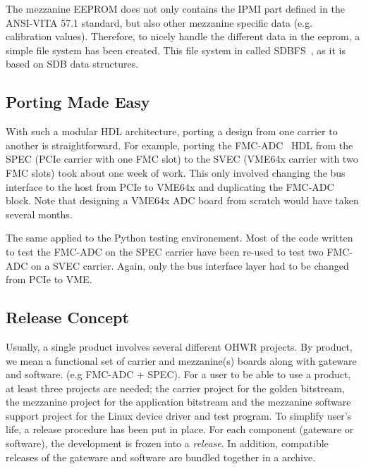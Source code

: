 \documentclass{JAC2003}
\begin{document}
The mezzanine EEPROM does not only contains the IPMI part defined in the ANSI-VITA 57.1 standard, but also other mezzanine specific data (e.g. calibration values).
Therefore, to nicely handle the different data in the eeprom, a simple file system has been created.
This file system in called SDBFS~\cite{sdbfs}, as it is based on SDB data structures.




\subsection{Porting Made Easy}
With such a modular HDL architecture, porting a design from one carrier to another is straightforward.
For example, porting the FMC-ADC~\cite{fmc-adc} HDL from the SPEC (PCIe carrier with one FMC slot) to the SVEC (VME64x carrier with two FMC slots) took about one week of work.
This only involved changing the bus interface to the host from PCIe to VME64x and duplicating the FMC-ADC block.
Note that designing a VME64x ADC board from scratch would have taken several months.

The same applied to the Python testing environement.
Most of the code written to test the FMC-ADC on the SPEC carrier have been re-used to test two FMC-ADC on a SVEC carrier.
Again, only the bus interface layer had to be changed from PCIe to VME.

\subsection{Release Concept}
Usually, a single product involves several different OHWR projects.
By product, we mean a functional set of carrier and mezzanine(s) boards along with gateware and software. (e.g FMC-ADC + SPEC).
For a user to be able to use a product, at least three projects are needed; the carrier project for the golden bitstream, the mezzanine project for the application bitstream and the mezzanine software support project for the Linux device driver and test program.
To simplify user's life, a release procedure has been put in place.
For each component (gateware or software), the development is frozen into a \textit{release}.
In addition, compatible releases of the gateware and software are bundled together in a archive.
\end{document}

